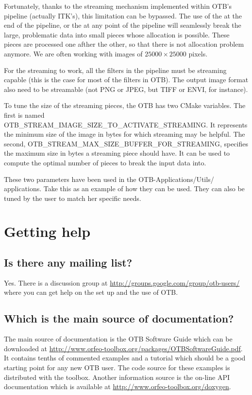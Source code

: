 Fortunately, thanks to the streaming mechanism implemented within
OTB's pipeline (actually ITK's), this limitation can be bypassed. The
use of the  at the end of the pipeline,
or the  at any point of the pipeline will
seamlessly break the large, problematic data into small pieces whose
allocation is possible. These pieces are processed one afther the
other, so that there is not allocation problem anymore. We are often working with
images of $25000 \times 25000$ pixels.

For the streaming to work, all the filters in the pipeline must be streaming capable
(this is the case for most of the filters in OTB). The output image format also need to be
streamable (not PNG or JPEG, but TIFF or ENVI, for instance).

To tune the size of the streaming pieces, the OTB has
two CMake variables. The first is named
OTB\_STREAM\_IMAGE\_SIZE\_TO\_ACTIVATE\_STREAMING. It represents the
minimum size of the image in bytes for which streaming may be helpful. The
second, OTB\_STREAM\_MAX\_SIZE\_BUFFER\_FOR\_STREAMING, specifies the
maximum size in bytes a streaming piece should have. It can be used to
compute the optimal number of pieces to break the input data into.

These two parameters have been used in the OTB-Applications/Utils/
applications. Take this as an example of how they can be used. They
can also be tuned by the user to match her specific needs.


\section{Getting help}
\subsection{Is there any mailing list?}
Yes. There is a discussion group at
\url{http://groups.google.com/group/otb-users/} where you can get help
on the set up and the use of OTB.

\subsection{Which is the main source of documentation?}
The main source of documentation is the OTB Software Guide which can
be downloaded at
\url{http://www.orfeo-toolbox.org/packages/OTBSoftwareGuide.pdf}. It
contains tenths of commented examples and a tutorial which should be a good starting
point for any new OTB user. The code source for these examples is
distributed with the toolbox. Another information source is the
on-line API documentation which is available at \url{http://www.orfeo-toolbox.org/doxygen}.

